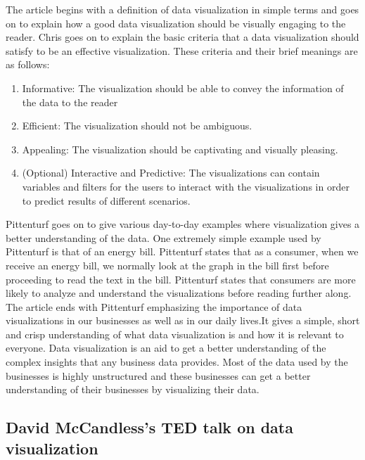 \documentclass[]{book}
\providecommand{\tightlist}{%
  \setlength{\itemsep}{0pt}\setlength{\parskip}{0pt}}
\theoremstyle{definition}
\theoremstyle{definition}
\theoremstyle{definition}
\theoremstyle{remark}
\begin{document}
The article begins with a definition of data visualization in simple
terms and goes on to explain how a good data visualization should be
visually engaging to the reader. Chris goes on to explain the basic
criteria that a data visualization should satisfy to be an effective
visualization. These criteria and their brief meanings are as follows:

\begin{enumerate}
\def\labelenumi{\arabic{enumi}.}
\tightlist
\item
  Informative: The visualization should be able to convey the
  information of the data to the reader
\item
  Efficient: The visualization should not be ambiguous.
\item
  Appealing: The visualization should be captivating and visually
  pleasing.
\item
  (Optional) Interactive and Predictive: The visualizations can contain
  variables and filters for the users to interact with the
  visualizations in order to predict results of different scenarios.
\end{enumerate}

Pittenturf goes on to give various day-to-day examples where
visualization gives a better understanding of the data. One extremely
simple example used by Pittenturf is that of an energy bill. Pittenturf
states that as a consumer, when we receive an energy bill, we normally
look at the graph in the bill first before proceeding to read the text
in the bill. Pittenturf states that consumers are more likely to analyze
and understand the visualizations before reading further along. The
article ends with Pittenturf emphasizing the importance of data
visualizations in our businesses as well as in our daily lives.It gives
a simple, short and crisp understanding of what data visualization is
and how it is relevant to everyone. Data visualization is an aid to get
a better understanding of the complex insights that any business data
provides. Most of the data used by the businesses is highly unstructured
and these businesses can get a better understanding of their businesses
by visualizing their data.

\subsection{David McCandless's TED talk on data
visualization}\label{david-mccandlesss-ted-talk-on-data-visualization}
\end{document}
